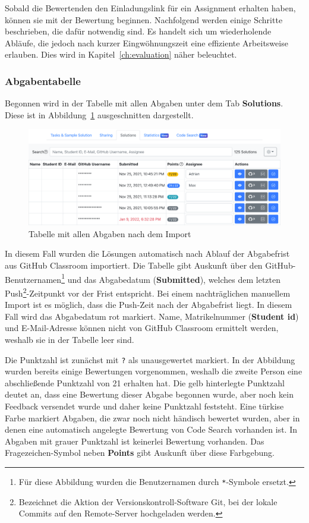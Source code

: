 Sobald die Bewertenden den Einladungslink für ein Assignment erhalten haben, können sie mit der Bewertung beginnen.
Nachfolgend werden einige Schritte beschrieben, die dafür notwendig sind.
Es handelt sich um wiederholende Abläufe, die jedoch nach kurzer Eingwöhnungszeit eine effiziente Arbeitsweise erlauben.
Dies wird in Kapitel~\ref{ch:evaluation} näher beleuchtet.

\subsubsection{Abgabentabelle}

Begonnen wird in der Tabelle mit allen Abgaben unter dem Tab \textbf{Solutions}.
Diese ist in Abbildung~\ref{fig:assignment-solutions-table} ausgeschnitten dargestellt.

\begin{figure}
    \centering
    \includegraphics[width=\textwidth]{images/assignment-solutions-table}
    \caption{Tabelle mit allen Abgaben nach dem Import}
    \label{fig:assignment-solutions-table}
\end{figure}

In diesem Fall wurden die Lösungen automatisch nach Ablauf der Abgabefrist aus GitHub Classroom importiert.
Die Tabelle gibt Auskunft über den GitHub-Benutzernamen\footnote{
    Für diese Abbildung wurden die Benutzernamen durch \texttt{*}-Symbole ersetzt.
} und das Abgabedatum (\textbf{Submitted}), welches dem letzten Push\footnote{
    Bezeichnet die Aktion der Versionskontroll-Software Git, bei der lokale Commits auf den Remote-Server hochgeladen werden.
}-Zeitpunkt vor der Frist entspricht.
Bei einem nachträglichen manuellem Import ist es möglich, dass die Push-Zeit nach der Abgabefrist liegt.
In diesem Fall wird das Abgabedatum rot markiert.
Name, Matrikelnummer (\textbf{Student \acs{id}}) und E-Mail-Adresse können nicht von GitHub Classroom ermittelt werden, weshalb sie in der Tabelle leer sind.

Die Punktzahl ist zunächst mit \texttt{?} als unausgewertet markiert.
In der Abbildung wurden bereits einige Bewertungen vorgenommen, weshalb die zweite Person eine abschließende Punktzahl von 21 erhalten hat.
Die gelb hinterlegte Punktzahl deutet an, dass eine Bewertung dieser Abgabe begonnen wurde, aber noch kein Feedback versendet wurde und daher keine Punktzahl feststeht.
Eine türkise Farbe markiert Abgaben, die zwar noch nicht händisch bewertet wurden, aber in denen eine automatisch angelegte Bewertung von Code Search vorhanden ist.
In Abgaben mit grauer Punktzahl ist keinerlei Bewertung vorhanden.
Das Fragezeichen-Symbol neben \textbf{Points} gibt Auskunft über diese Farbgebung.

